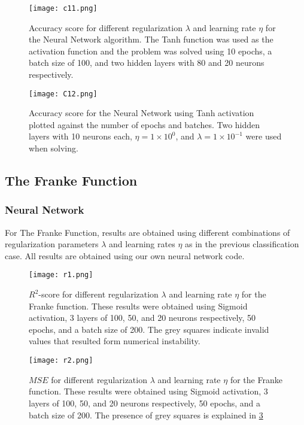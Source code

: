 \documentclass{emulateapj}
\begin{document}
\begin{figure}[H]
    \centering
    \texttt{[image: c11.png]}
    \caption{Accuracy score for different regularization $\lambda$ and learning rate $\eta$ for the Neural Network algorithm. The Tanh function was used as the activation function and the problem was solved using 10 epochs, a batch size of 100, and two hidden layers with 80 and 20 neurons respectively.}
    \label{fig14}
\end{figure}

\begin{figure}[H]
    \centering
    \texttt{[image: C12.png]}
    \caption{Accuracy score for the Neural Network using Tanh activation plotted against the number of epochs and batches. Two hidden layers with 10 neurons each, $\eta = 1\times 10^0$, and $\lambda = 1\times 10^{-1}$ were used when solving.}
    \label{fig15}
\end{figure}
\subsection{The Franke Function}
\subsubsection{Neural Network}
For The Franke Function, results are obtained using different combinations of regularization
parameters $\lambda$ and learning rates $\eta$ as in the previous classification case. All results are obtained using our own neural network code.



\begin{figure}[H]
    \centering
    \texttt{[image: r1.png]}
    \caption{$R^2$-score for different regularization $\lambda$ and learning rate $\eta$ for the Franke function. These results were obtained using Sigmoid activation, 3 layers of 100, 50, and 20 neurons respectively, 50 epochs, and a batch size of 200. The grey squares indicate invalid values that resulted form numerical instability. }
    \label{fig16}
\end{figure}

\begin{figure}[H]
    \centering
    \texttt{[image: r2.png]}
    \caption{$MSE$ for different regularization $\lambda$ and learning rate $\eta$ for the Franke function. These results were obtained using Sigmoid activation, 3 layers of 100, 50, and 20 neurons respectively, 50 epochs, and a batch size of 200.  The presence of grey squares is explained in \ref{fig16}}
    \label{fig17}
\end{figure}
\end{document}
